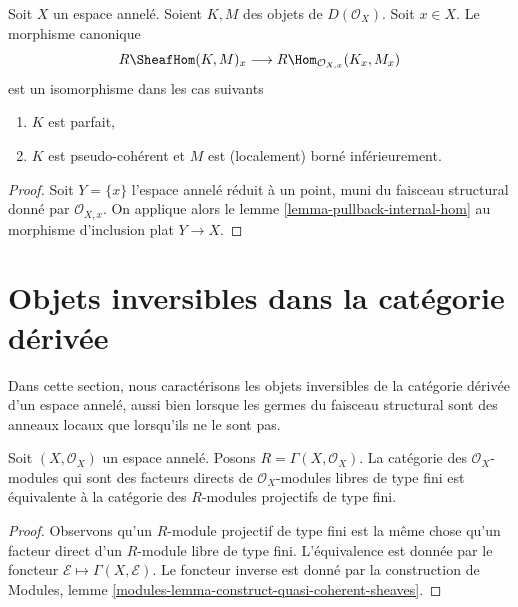 \begin{lemma}

\label{lemma-stalk-internal-hom}
Soit $X$ un espace annelé. Soient $K, M$ des objets de $D(\mathcal{O}_X)$. Soit $x \in X$. Le morphisme canonique $$
R\SheafHom(K, M)_x \longrightarrow
R\Hom_{\mathcal{O}_{X, x}}(K_x, M_x)
$$ est un isomorphisme dans les cas suivants
\begin{enumerate}
\item $K$ est parfait,
\item $K$ est pseudo-cohérent et $M$ est (localement) borné inférieurement.
\end{enumerate}

\end{lemma}

\begin{proof}
Soit $Y = \{x\}$ l'espace annelé réduit à un point, muni du faisceau structural donné par $\mathcal{O}_{X, x}$. On applique alors le lemme \ref{lemma-pullback-internal-hom} au morphisme d'inclusion plat $Y \to X$.
\end{proof}







\section{Objets inversibles dans la catégorie dérivée}
\label{section-invertible-D-or-R}

\noindent
Dans cette section, nous caractérisons les objets inversibles de la catégorie dérivée d'un espace annelé, aussi bien lorsque les germes du faisceau structural sont des anneaux locaux que lorsqu'ils ne le sont pas.

\begin{lemma}

\label{lemma-category-summands-finite-free}
Soit $(X, \mathcal{O}_X)$ un espace annelé. Posons $R = \Gamma(X, \mathcal{O}_X)$. La catégorie des $\mathcal{O}_X$-modules qui sont des facteurs directs de $\mathcal{O}_X$-modules libres de type fini est équivalente à la catégorie des $R$-modules projectifs de type fini.
\end{lemma}

\begin{proof}
Observons qu'un $R$-module projectif de type fini est la même chose qu'un facteur direct d'un $R$-module libre de type fini. L'équivalence est donnée par le foncteur $\mathcal{E} \mapsto
\Gamma(X, \mathcal{E})$. Le foncteur inverse est donné par la construction de Modules, lemme \ref{modules-lemma-construct-quasi-coherent-sheaves}.
\end{proof}

